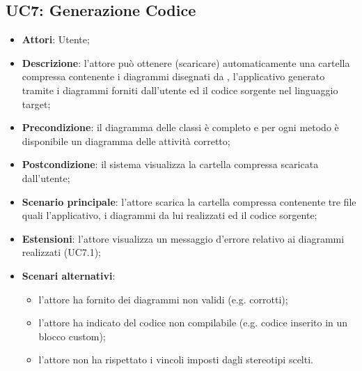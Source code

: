 \begin{itemize}
\begin{itemize}
\begin{itemize}
\begin{itemize}
\subsection{UC7: Generazione Codice}
\label{UC7}
\begin{itemize}
	\item \textbf{Attori}: Utente;
	\item \textbf{Descrizione}: l'attore può ottenere (scaricare) automaticamente una cartella compressa contenente i diagrammi disegnati da \proj{}, l'applicativo generato tramite i diagrammi forniti dall'utente ed il codice sorgente nel linguaggio target;
	\item \textbf{Precondizione}: il diagramma delle classi è completo e per ogni metodo è disponibile un diagramma delle attività corretto;
	\item \textbf{Postcondizione}: il sistema visualizza la cartella compressa scaricata dall'utente;
	\item \textbf{Scenario principale}: l'attore scarica la cartella compressa contenente tre file quali l'applicativo, i diagrammi da lui realizzati ed il codice sorgente;
	\item \textbf{Estensioni}: l'attore visualizza un messaggio d'errore relativo ai diagrammi realizzati (UC7.1);
	\item \textbf{Scenari alternativi}:
	\begin{itemize}
	  \item l'attore ha fornito dei diagrammi non validi (e.g. corrotti);
		\item l'attore ha indicato del codice non compilabile (e.g. codice inserito in un blocco custom);
		\item l'attore non ha rispettato i vincoli imposti dagli stereotipi scelti.
	\end{itemize}
\end{itemize}


\end{itemize}
\end{itemize}
\end{itemize}
\end{itemize}
